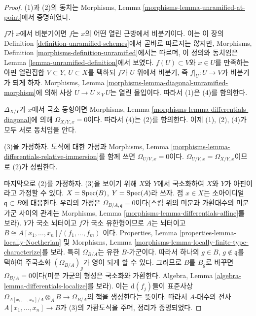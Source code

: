 \begin{proof}
(1)과 (2)의 동치는 Morphisms, Lemma
\ref{morphisms-lemma-unramified-at-point}에서 증명하였다.

\medskip\noindent
$f$가 $x$에서 비분기이면 $f$는 $x$의 어떤 열린 근방에서
비분기이다. 이는 이 장의 Definition
\ref{definition-unramified-schemes}에서 곧바로 따르지는 않지만,
Morphisms, Definition \ref{morphisms-definition-unramified}에서는 따르며,
이 정의와 동치임은 Lemma \ref{lemma-unramified-definition}에서 보였다.
$f(U) \subset V$와 $x \in U$를 만족하는 아핀 열린집합
$V \subset Y$, $U \subset X$를 택하되 $f$가 $U$ 위에서
비분기, 즉 $f|_U : U \to V$가 비분기가 되게 하자.
Morphisms, Lemma \ref{morphisms-lemma-diagonal-unramified-morphism}에 의해
사상 $U \to U \times_V U$는 열린 몰입이다. 따라서 (1)은 (4)를 함의한다.

\medskip\noindent
$\Delta_{X/Y}$가 $x$에서 국소 동형이면 Morphisms, Lemma
\ref{morphisms-lemma-differentials-diagonal}에 의해
$\Omega_{X/Y, x} = 0$이다. 따라서 (4)는 (2)를 함의한다.
이제 (1), (2), (4)가 모두 서로 동치임을 안다.

\medskip\noindent
(3)을 가정하자. 도식에 대한 가정과 Morphisms, Lemma
\ref{morphisms-lemma-differentials-relative-immersion}를 함께 쓰면
$\Omega_{U/V, x} = 0$이다. $\Omega_{U/V, x} = \Omega_{X/Y, x}$이므로
(2)가 성립한다.

\medskip\noindent
마지막으로 (2)를 가정하자. (3)을 보이기 위해 $X$와 $Y$에서
국소화하여 $X$와 $Y$가 아핀이라고 가정할 수 있다.
$X = \mathop{\mathrm{Spec}}(B)$, $Y = \mathop{\mathrm{Spec}}(A)$라 쓰자. 점 $x \in X$는
소아이디얼 $\mathfrak q \subset B$에 대응한다. 우리의 가정은
$\Omega_{B/A, \mathfrak q} = 0$이다(스킴 위의 미분과 가환대수의
미분 가군 사이의 관계는 Morphisms, Lemma
\ref{morphisms-lemma-differentials-affine}를 보라).
$Y$가 국소 뇌터이고 $f$가 국소 유한형이므로 $A$는 뇌터이고
$B \cong A[x_1, \ldots, x_n]/(f_1, \ldots, f_m)$
이다. Properties, Lemma \ref{properties-lemma-locally-Noetherian} 및
Morphisms, Lemma \ref{morphisms-lemma-locally-finite-type-characterize}를
보라. 특히 $\Omega_{B/A}$는 유한 $B$-가군이다. 따라서 하나의
$g \in B$, $g \not \in \mathfrak q$를 택하여 주국소화
$(\Omega_{B/A})_g$가 영이 되게 할 수 있다. 그러므로 $B$를 $B_g$로
바꾸면 $\Omega_{B/A} = 0$이다(미분 가군의 형성은 국소화와 가환한다.
Algebra, Lemma \ref{algebra-lemma-differentials-localize}를 보라).
이는 $\text{d}(f_j)$들이 표준사상
$\Omega_{A[x_1, \ldots, x_n]/A} \otimes_A B \to \Omega_{B/A}$의
핵을 생성한다는 뜻이다. 따라서 $A$-대수의 전사
$A[x_1, \ldots, x_n] \to B$가 (3)의 가환도식을 주며, 정리가 증명되었다.
\end{proof}

